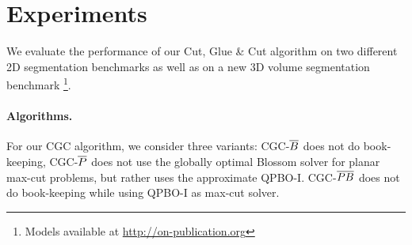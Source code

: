 \section{Experiments\label{sec:experiments}}
We evaluate the performance of our Cut, Glue \& Cut algorithm on
two different 2D segmentation benchmarks as well as
on a new 3D volume segmentation benchmark%
\footnote{Models available at \url{http://on-publication.org}}.

\paragraph{Algorithms.}
For our CGC algorithm, we consider three variants:
CGC-$\overline{B}$ does not do book-keeping, CGC-$\overline{P}$ does not use
the globally optimal Blossom solver for planar max-cut problems,
but rather uses the approximate \mbox{QPBO-I}.
CGC-$\overline{PB}$ does not do book-keeping while using \mbox{QPBO-I} as
max-cut solver.

